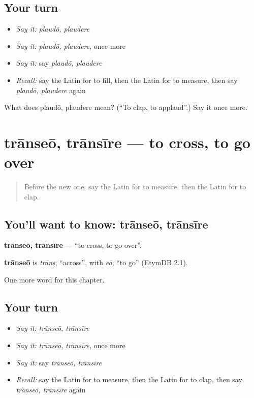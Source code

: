 \subsection*{Your turn}
\begin{itemize}
\raggedright
  \item \emph{Say it:} \emph{plaudō, plaudere}
  \item \emph{Say it:} \emph{plaudō, plaudere}, once more
  \item \emph{Say it:} say \emph{plaudō, plaudere}
  \item \emph{Recall:} say the Latin for to fill, then the Latin for to measure, then say \emph{plaudō, plaudere} again
\end{itemize}

\begin{tcolorbox}[breakable,colback=teal!4,colframe=teal!35!black,title={Before you move on}]
What does plaudō, plaudere mean? (\textquotedblleft{}To clap, to applaud\textquotedblright{}.) Say it once more.
\end{tcolorbox}
\section[trānseō, trānsīre]{trānseō, trānsīre — to cross, to go over}

\label{lesson:LA-C256-transeo}



\begin{quote}
Before the new one: say the Latin for to measure, then the Latin for to clap.
\end{quote}

\subsection*{You'll want to know: trānseō, trānsīre}
\textbf{trānseō, trānsīre} — \textquotedblleft{}to cross, to go over\textquotedblright{}.

\begin{cousinweb}
\textbf{trānseō} is \emph{trāns}, \textquotedblleft{}across\textquotedblright{}, with \emph{eō}, \textquotedblleft{}to go\textquotedblright{} (EtymDB 2.1).
\end{cousinweb}

\begin{grammarlens}[title={What you've built}]
One more word for this chapter.
\end{grammarlens}

\subsection*{Your turn}
\begin{itemize}
\raggedright
  \item \emph{Say it:} \emph{trānseō, trānsīre}
  \item \emph{Say it:} \emph{trānseō, trānsīre}, once more
  \item \emph{Say it:} say \emph{trānseō, trānsīre}
  \item \emph{Recall:} say the Latin for to measure, then the Latin for to clap, then say \emph{trānseō, trānsīre} again
\end{itemize}

